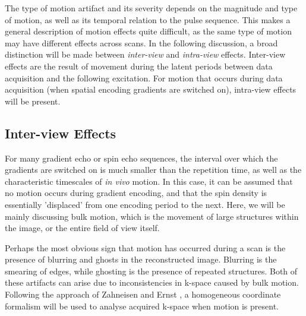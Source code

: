 \documentclass[class=article, crop=false]{standalone}
\begin{document}
The type of motion artifact and its severity depends on the magnitude and type of motion, as well as its temporal relation to the pulse sequence. This makes a general description of motion effects quite difficult, as the same type of motion may have different effects across scans. In the following discussion, a broad distinction will be made between \textit{inter-view} and \textit{intra-view} effects. Inter-view effects are the result of movement during the latent periods between data acquisition and the following excitation. For motion that occurs during data acquisition (when spatial encoding gradients are switched on), intra-view effects will be present.

\subsection{Inter-view Effects}

For many gradient echo or spin echo sequences, the interval over which the gradients are switched on is much smaller than the repetition time, as well as the characteristic timescales of \textit{in vivo} motion. In this case, it can be assumed that no motion occurs during gradient encoding, and that the spin density is essentially 'displaced' from one encoding period to the next. Here, we will be mainly discussing bulk motion, which is the movement of large structures within the image, or the entire field of view itself. 
\par
Perhaps the most obvious sign that motion has occurred during a scan is the presence of blurring and ghosts in the reconstructed image. Blurring is the smearing of edges, while ghosting is the presence of repeated structures. Both of these artifacts can arise due to inconsistencies in k-space caused by bulk motion. Following the approach of Zahneisen and Ernst \parencite*{Zahneisen2016}, a homogeneous coordinate formalism will be used to analyse acquired k-space when motion is present.
\end{document}
